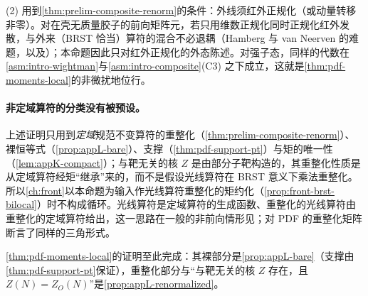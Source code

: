 (2) 用到\cref{thm:prelim-composite-renorm}的条件：外线须红外正规化（或动量转移非零）。对在壳无质量胶子的前向矩阵元，若只用维数正规化同时正规化红外发散，与外来（BRST 恰当）算符的混合不必退耦（Hamberg 与 van Neerven 的难题\cite{Hamberg:1991qt}，以及\cite{Collins:1994ee}）；本命题因此只对红外正规化的外态陈述。对强子态，同样的代数在\cref{asm:intro-wightman}与\cref{asm:intro-composite}(C3) 之下成立，这就是\cref{thm:pdf-moments-local}的非微扰地位行。

\paragraph{非定域算符的分类没有被预设。}
上述证明只用到\emph{定域}规范不变算符的重整化（\cref{thm:prelim-composite-renorm}）、裸恒等式（\cref{prop:appL-bare}）、支撑（\cref{thm:pdf-support-pt}）与矩的唯一性（\cref{lem:appK-compact}）；与靶无关的核 $Z$ 是由部分子靶构造的，其重整化性质是从定域算符经矩“继承”来的，而不是假设光线算符在 BRST 意义下乘法重整化。所以\cref{ch:front}以本命题为输入作光线算符重整化的矩约化（\cref{prop:front-brst-bilocal}）时不构成循环。光线算符是定域算符的生成函数、重整化的光线算符由重整化的定域算符给出，这一思路在一般的非前向情形见\cite[式~(2.4)、(2.6)、(3.1)、(3.2)]{Braun:2019qtp}；\cite[第~11.4~节]{Collins2011}对 PDF 的重整化矩阵断言了同样的三角形式。

\cref{thm:pdf-moments-local}的证明至此完成：其裸部分是\cref{prop:appL-bare}（支撑由\cref{thm:pdf-support-pt}保证），重整化部分与“与靶无关的核 $Z$ 存在，且 $Z(N)=Z_O(N)$”是\cref{prop:appL-renormalized}。
